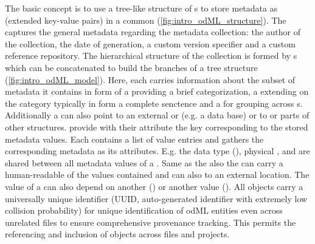 The basic concept is to use a tree-like structure of s to store metadata as  (extended key-value pairs) in a common  (\cref{fig:intro_odML_structure}). The  captures the general metadata regarding the metadata collection: the author of the collection, the date of generation, a custom version specifier and a custom reference repository. The hierarchical structure of the collection is formed by s which can be concatenated to build the branches of a tree structure (\cref{fig:intro_odML_model}). Here, each  carries information about the subset of metadata it contains in form of a   providing a brief categorization, a  extending on the category typically in form a complete senctence and a  for grouping across s. Additionally a  can also point to an external  or  (e.g. a data base) or  to or  parts of other  structures.  provide with their  attribute the key corresponding to the stored metadata values. Each  contains a list of value entries and gathers the corresponding metadata as its  attributes. E.g. the data type (), physical ,  and  are shared between all metadata values of a . Same as the  also the  can carry a human-readable  of the values contained and can also  to an external location. The value of a  can also depend on another  () or another  value (). All  objects carry a universally unique identifier (UUID, auto-generated identifier with extremely low collision probability) for unique identification of odML entities even across unrelated files to ensure comprehensive provenance tracking. This permits the referencing and inclusion of  objects across files and projects.\\

